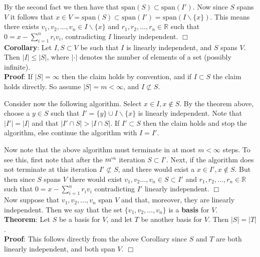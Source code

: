 \documentclass[12pt,oneside]{article}
\begin{document}
By the second fact we then have that \( \text{span}(S) \subset \text{span}(I') \). Now since \( S \) spans \(V\) it follows that \(x \in V =\text{span}(S) \subset \text{span}(I') =\text{span}(I\backslash \{x\}) \). This means there exists \(v_1,v_2,\dots,v_n \in I \backslash \{x\} \) and \(r_1,r_2,\dots,r_n \in \mathbb{R} \) such that \(0 =x- \sum_{i=1}^{n} r_iv_i \), contradicting \(I \) linearly independent. $\Box$\\


\textbf{Corollary}: Let \(I,S \subset V\) be such that \( I \) is linearly independent, and \( S \) spans \(V\). Then \( |I| \le |S| \), where \( |\cdotp|\) denotes the number of elements of a set (possibly infinite).\\

\textbf{Proof}: If \( |S| = \infty \) then the claim holds by convention, and if \( I \subset S \) the claim holds directly. So assume \( |S|=m < \infty \), and \( I \not \subset S \).

Consider now the following algorithm. Select \( x \in I, x\notin S\). By the theorem above, choose a \( y \in S \) such that \( I'= \{y\}\cup I\backslash\{x\} \) is linearly independent. Note that \( |I'|=|I| \) and that \( |I'\cap S| >  |I\cap S| \). If \(I' \subset S \) then the claim holds and stop the algorithm, else continue the algorithm with \(I=I'\).

Now note that the above algorithm must terminate in at most \(m < \infty \) steps. To see this, first note that after the \(m^{\text{\tiny th}} \) iteration \( S \subset I' \). Next, if the algorithm does not terminate at this iteration \( I' \not\subset S \), and there would exist a \(x \in I', x \notin S \). But then since \( S \) spans \(V\) there would exist \(v_1,v_2\dots,v_n \in S \subset I'\) and \(r_1,r_2,\dots,r_n \in \mathbb{R} \) such that \(0=x-\sum_{i=1}^n r_iv_i \) contradicting \(I'\) linearly independent. $\Box$\\


Now suppose that $v_{1}, v_{2}, \ldots, v_{n}$ span $V$ and that,
moreover, they are linearly independent. Then we say that the set $\{
v_{1}, v_{2}, \ldots, v_{n} \}$ is a \textbf{basis} for $V$.\\

\textbf{Theorem}: Let $S$ be a basis for
$V$, and let $T$ be another basis for
$V$. Then $|S| = |T|$.\\

\textbf{Proof}: This follows directly from the above Corollary since \(S\) and \(T\) are both linearly independent, and both span \(V\). $\Box$
\\
\end{document}
